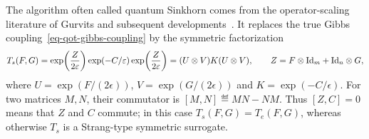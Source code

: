 The algorithm often called quantum Sinkhorn comes from the operator-scaling literature of Gurvits and subsequent developments~\cite{gurvits2003classical,gurvits2004classical,georgiou2015positive,garg2018recent}. It replaces the true Gibbs coupling~\eqref{eq-qot-gibbs-coupling} by the symmetric factorization
\begin{equation}\label{eq-qot-symmetric-scaling}
	T_s(F,G)
	=
	\exp\!\left(\frac{Z}{2\varepsilon}\right)\exp(-C/\varepsilon)\exp\!\left(\frac{Z}{2\varepsilon}\right)
	=
	(U\otimes V)K(U\otimes V),
	\qquad
	Z=F\otimes\mathrm{Id}_m+\mathrm{Id}_n\otimes G,
\end{equation}
where $U=\exp(F/(2\epsilon))$, $V=\exp(G/(2\epsilon))$ and $K=\exp(-C/\epsilon)$. For two matrices $M,N$, their commutator is $[M,N]\eqdef MN-NM$. Thus $[Z,C]=0$ means that $Z$ and $C$ commute; in this case $T_s(F,G)=T_e(F,G)$, whereas otherwise $T_s$ is a Strang-type symmetric surrogate.

